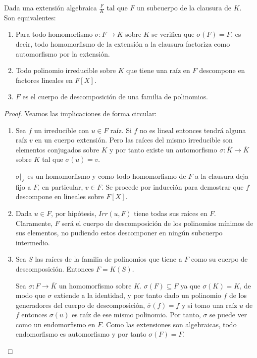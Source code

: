 \begin{proposition}
Dada una extensión algebraica $\frac{F}{K}$ tal que $F$ un subcuerpo de la clausura de $K$. Son equivalentes:

\begin{enumerate}
\item Para todo homomorfismo $\sigma:F \to \overline{K}$ sobre $K$ se verifica que $\sigma(F) = F$, es decir, todo homomorfismo de la extensión a la clausura factoriza como automorfismo por la extensión.
\item Todo polinomio irreducible sobre $K$ que tiene una raíz en $F$ descompone en factores lineales en $F[X]$. 
\item $F$ es el cuerpo de descomposición de una familia de polinomios. 
\end{enumerate}
\end{proposition}
\begin{proof}
Veamos las implicaciones de forma circular:

\begin{enumerate}
\item Sea $f$ un irreducible con $u \in F$ raíz. Si $f$ no es lineal entonces tendrá alguna raíz $v$ en un cuerpo extensión. Pero las raíces del mismo irreducible son elementos conjugados sobre $K$ y por tanto existe un automorfismo $\sigma:\overline{K} \to \overline{K}$ sobre $K$ tal que $\sigma(u) = v$. 

$\sigma|_F$ es un homomorfismo y como todo homomorfismo de $F$ a la clausura deja fijo a $F$, en particular, $v \in F$. Se procede por inducción para demostrar que $f$ descompone en lineales sobre $F[X]$. 

\item Dada $u \in F$, por hipótesis, $Irr(u,F)$ tiene todas sus raíces en $F$. Claramente, $F$ será el cuerpo de descomposición de los polinomios mínimos de sus elementos, no pudiendo estos descomponer en ningún subcuerpo intermedio. 

\item Sea $S$ las raíces de la familia de polinomios que tiene a $F$ como su cuerpo de descomposición. Entonces $F = K(S)$. 

Sea $\sigma:F \to \overline{K}$ un homomorfismo sobre $K$. $\sigma(F) \subseteq F$ ya que $\sigma(K) = K$, de modo que $\sigma$ extiende a la identidad, y por tanto dado un polinomio $f$ de los generadores del cuerpo de descomposición, $\overline{\sigma}(f) = f$ y si tomo una raíz $u$ de $f$ entonces $\sigma(u)$ es raíz de ese mismo polinomio. Por tanto, $\sigma$ se puede ver como un endomorfismo en $F$. Como las extensiones son algebraicas, todo endomorfismo es automorfismo y por tanto $\sigma(F) = F$. 
\end{enumerate}
\end{proof}

